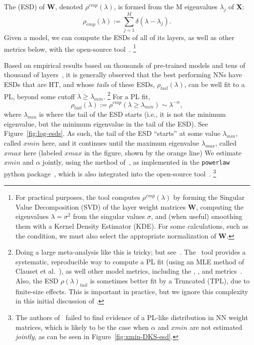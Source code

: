 \noindent
The \EmpiricalSpectralDensity (ESD) of $\mathbf{W}$, denoted $\rho^{emp}(\lambda)$, is formed from the M eigenvalues $\lambda_{j}$ of $\mathbf{X}$:
\begin{equation}
\rho_{emp}(\lambda):=\sum_{j=1}^{M}\delta(\lambda-\lambda_{j}) .
\label{eqn:rho}
\end{equation}
Given a model, we can compute the ESDs of all of its layers, as well as other metrics below,
with the open-source \WW tool~\cite{WW}.%
\footnote{For practical purposes, the \WW tool computes $\rho^{emp}(\lambda)$ by forming the Singular Value Decomposition (SVD) of the layer weight matrices $\mathbf{W}$, computing the eigenvalues $\lambda=\sigma^{2}$ from the singular values $\sigma$, and (when useful) smoothing them with a Kernel Density Estimator (KDE). For some calculations, such as the \TRACELOG condition, we must also select the appropriate normalization of $\mathbf{W}$.}


Based on empirical results based on thousands of pre-trained models and tens of thousand of layers~\cite{MM18_TR_JMLRversion,MM20a_trends_NatComm,MM21a_simpsons_TR,YTHx23_KDD}, 
it is generally observed that the 
best performing NNs have ESDs that are HT, and whose \emph{tails} of these ESDs, $\rho_{tail}(\lambda)$, can be well fit to a PL, beyond some cutoff $\lambda\ge\lambda_{min}$.%
\footnote{Doing a large meta-analysis like this is tricky; but see~\cite{MM18_TR_JMLRversion,MM20a_trends_NatComm,MM21a_simpsons_TR,YTHx23_KDD}.  The \WW~tool provides a systematic, reproducible way to compute a PL fit (using an MLE method of Clauset et al.~\cite{CSN09_powerlaw}), as well other model metrics, including the \SPECTRALNORM, \RANDDIST, and \ALPHAHAT metrics~\cite{MM20a_trends_NatComm}.  Also, the ESD $\rho(\lambda)_{tail}$ is sometimes better fit by a Truncated \PowerLaw (TPL), due to finite-size effects. This is important in practice, but we ignore this complexity in this initial discussion of \SETOL.  }
For a PL fit,
\begin{equation}
\rho_{tail}(\lambda):=\rho^{emp}(\lambda\ge\lambda_{min})\sim\lambda^{-\alpha} ,
\label{eqn:rho_tail}
\end{equation}
where $\lambda_{min}$ is where the tail of the ESD starts (i.e., it is not the minimum eigenvalue, but the minimum eigenvalue in the tail of the ESD). 
See Figure~\ref{fig:log-esds}.
As such, the tail of the ESD ``starts'' at some value $\lambda_{min}$, called $xmin$ here, and it continues until the 
maximum eigenvalue $\lambda_{max}$, called $xmax$ here
(labeled $xmax$ in the figure, shown by the orange line)
We estimate $xmin$ and $\alpha$ jointly, using the method of~\cite{CSN09_powerlaw}, 
as implemented in the \texttt{powerlaw} python package~\cite{ABP14}, 
which is also integrated into the open-source \WW tool~\cite{MM20a_trends_NatComm, WW}.%
\footnote{The authors of~\cite{Thamm2022} failed to find evidence of a PL-like distribution in NN weight matrices, which is 
likely to be the case when $\alpha$ and $xmin$ are not estimated \emph{jointly}, as can be seen in Figure~\ref{fig:xmin-DKS-esd}.  }


